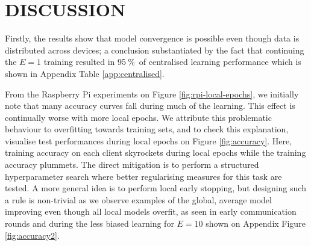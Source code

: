 \documentclass{article}
\newcommand{\unit}[1]{\ensuremath{\:\text{#1}}}
\newcommand{\pro}{\ensuremath{\unit{\%{}}}}
\begin{document}
\section{DISCUSSION}%
\label{sec:discussion}

Firstly, the results show that model convergence is possible even though data is distributed across devices; a conclusion substantiated by the fact that continuing the $E=1$ training resulted in 95\pro\ of centralised learning performance which is shown in Appendix Table \ref{app:centralised}.

From the Raspberry Pi experiments on Figure \ref{fig:rpi-local-epochs}, we initially note that many accuracy curves fall during much of the learning.
This effect is continually worse with more local epochs.
We attribute this problematic behaviour to overfitting towards training sets, and to check this explanation, visualise test performances during local epochs on Figure \ref{fig:accuracy}.
Here, training accuracy on each client skyrockets during local epochs while the training accuracy plummets.
The direct mitigation is to perform a structured hyperparameter search where better regularising measures for this task are tested.
A more general idea is to perform local early stopping, but designing such a rule is non-trivial as we observe examples of the global, average model improving even though all local models overfit, as seen in early communication rounds and during the less biased learning for $E=10$ shown on Appendix Figure \ref{fig:accuracy2}.
\end{document}
